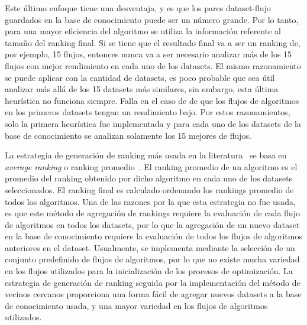 Este último enfoque tiene una desventaja, y es que los pares dataset-flujo guardados en la base de conocimiento puede ser un número grande. Por lo tanto, para una mayor eficiencia del algoritmo se utiliza la información referente al tamaño del ranking final. Si se tiene que el resultado final va a ser un ranking de, por ejemplo, 15 flujos, entonces nunca va a ser necesario analizar más de los 15 flujos con mejor rendimiento en cada uno de los datasets. El mismo razonamiento se puede aplicar con la cantidad de datasets, es poco probable que sea útil analizar más allá de los 15 datasets más similares, sin embargo, esta última heurística no funciona siempre. Falla en el caso de  
de que los flujos de algoritmos en los primeros datasets tengan un rendimiento bajo. %
Por estos razonamientos, solo la primera heurística fue implementada y para cada uno de los datasets de la base de conocimiento se analizan solamente los 15 mejores de flujos.

La estrategia de generación de ranking más usada en la literatura~\cite{fuerer2015efficient, sun2014MetaLearningAT, bradzil2009metalearning} se basa en \textit{average ranking} o ranking promedio~\cite{bradzil2009metalearning}. 
El ranking promedio de un algoritmo es el promedio del ranking obtenido por dicho algoritmo en cada uno de los datasets seleccionados. El ranking final es calculado ordenando los rankings promedio de todos los algoritmos. Una de las razones por la que esta estrategia no fue usada, es que este método de agregación de rankings requiere la evaluación de cada flujo de algoritmos en todos los datasets, por lo que la agregación de un nuevo dataset en la base de conocimiento requiere la evaluación de todos los flujos de algoritmos anteriores en el dataset. Usualmente, se implementa mediante la selección de un conjunto predefinido de flujos de algoritmos, por lo que no existe mucha variedad en los flujos utilizados para la inicialización de los procesos de optimización. La estrategia de generación de ranking seguida por la implementación del método de vecinos cercanos proporciona una forma fácil de agregar nuevos datasets a la base de conocimiento usada, y una mayor variedad en los flujos de algoritmos utilizados.

